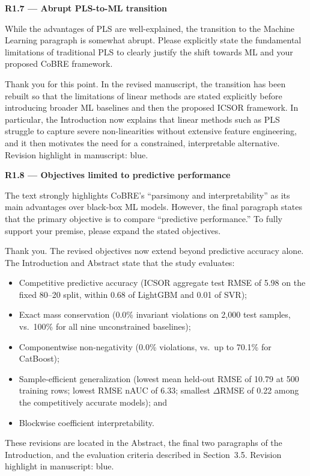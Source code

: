 \documentclass[a4paper,11pt]{article}
\newcommand{\reviewlabel}[1]{\noindent\textbf{\textcolor{accentblue}{#1}}\par\medskip}
\newcommand{\revhighlight}[2]{\textcolor{#1}{Revision highlight in manuscript: #2.}}
\begin{document}
\reviewlabel{R1.7 --- Abrupt PLS-to-ML transition}
\begin{reviewbox}
While the advantages of PLS are well-explained, the transition to the Machine Learning paragraph is somewhat abrupt. Please explicitly state the fundamental limitations of traditional PLS to clearly justify the shift towards ML and your proposed CoBRE framework.
\end{reviewbox}

Thank you for this point. In the revised manuscript, the transition has been rebuilt so that the limitations of linear methods are stated explicitly before introducing broader ML baselines and then the proposed ICSOR framework. In particular, the Introduction now explains that linear methods such as PLS struggle to capture severe non-linearities without extensive feature engineering, and it then motivates the need for a constrained, interpretable alternative. \revhighlight{revDefault}{blue}

\reviewlabel{R1.8 --- Objectives limited to predictive performance}
\begin{reviewbox}
The text strongly highlights CoBRE's ``parsimony and interpretability'' as its main advantages over black-box ML models. However, the final paragraph states that the primary objective is to compare ``predictive performance.'' To fully support your premise, please expand the stated objectives.
\end{reviewbox}

Thank you. The revised objectives now extend beyond predictive accuracy alone. The Introduction and Abstract state that the study evaluates:
\begin{itemize}[nosep]
\item Competitive predictive accuracy (ICSOR aggregate test RMSE of 5.98 on the fixed 80--20 split, within 0.68 of LightGBM and 0.01 of SVR);
\item Exact mass conservation (0.0\% invariant violations on 2,000 test samples, vs.\ 100\% for all nine unconstrained baselines);
\item Componentwise non-negativity (0.0\% violations, vs.\ up to 70.1\% for CatBoost);
\item Sample-efficient generalization (lowest mean held-out RMSE of 10.79 at 500 training rows; lowest RMSE nAUC of 6.33; smallest $\Delta$RMSE of 0.22 among the competitively accurate models); and
\item Blockwise coefficient interpretability.
\end{itemize}
These revisions are located in the Abstract, the final two paragraphs of the Introduction, and the evaluation criteria described in Section~3.5. \revhighlight{revDefault}{blue}
\end{document}
